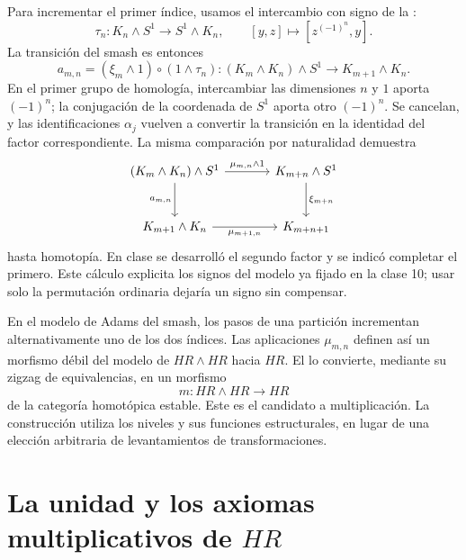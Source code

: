 Para incrementar el primer índice, usamos el intercambio con signo de la :
\[
\tau_n\colon K_n\wedge S^1\longrightarrow S^1\wedge K_n,
\qquad [y,z]\longmapsto[z^{(-1)^n},y].
\]
La transición del smash es entonces
\[
a_{m,n}=(\xi_m\wedge1)\circ(1\wedge\tau_n)
\colon(K_m\wedge K_n)\wedge S^1\longrightarrow K_{m+1}\wedge K_n.
\]
En el primer grupo de homología, intercambiar las dimensiones $n$ y $1$ aporta $(-1)^n$; la conjugación de la coordenada de $S^1$ aporta otro $(-1)^n$. Se cancelan, y las identificaciones $\alpha_j$ vuelven a convertir la transición en la identidad del factor correspondiente. La misma comparación por naturalidad demuestra
\[
\begin{tikzcd}[column sep=large,row sep=large]
(K_m\wedge K_n)\wedge S^1\arrow[r,"\mu_{m,n}\wedge1"]\arrow[d,"a_{m,n}"']&
K_{m+n}\wedge S^1\arrow[d,"\xi_{m+n}"]\\
K_{m+1}\wedge K_n\arrow[r,"\mu_{m+1,n}"']&K_{m+n+1}
\end{tikzcd}
\]
hasta homotopía. En clase se desarrolló el segundo factor y se indicó completar el primero. Este cálculo explicita los signos del modelo ya fijado en la clase 10; usar solo la permutación ordinaria dejaría un signo sin compensar.

En el modelo de Adams del smash, los pasos de una partición incrementan alternativamente uno de los dos índices. Las aplicaciones $\mu_{m,n}$ definen así un morfismo débil del modelo de $HR\wedge HR$ hacia $HR$. El  lo convierte, mediante su zigzag de equivalencias, en un morfismo
\[
m\colon HR\wedge HR\longrightarrow HR
\]
de la categoría homotópica estable. Este es el candidato a multiplicación. La construcción utiliza los niveles y sus funciones estructurales, en lugar de una elección arbitraria de levantamientos de transformaciones.

\section{La unidad y los axiomas multiplicativos de \texorpdfstring{$HR$}{HR}}


